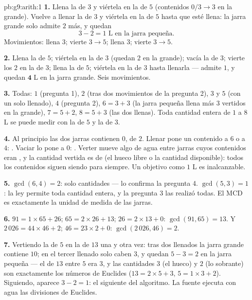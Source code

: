 \begin{solution}{pb:g9:arith:1}
\textbf{1.} Llena la de $3$ y viértela en la de $5$ (contenidos
$0/3 \to 3$ en la grande). Vuelve a llenar la de $3$ y viértela en la
de $5$ hasta que esté llena: la jarra grande solo admite $2$ más, y quedan
\[
3 - 2 = 1 \text{ L en la jarra pequeña.}
\]
Movimientos: llena $3$; vierte $3 \to 5$; llena $3$; vierte $3 \to 5$.

\textbf{2.} Llena la de $5$; viértela en la de $3$ (quedan $2$ en la
grande); vacía la de $3$; vierte los $2$ en la de $3$; llena la de $5$;
viértela en la de $3$ hasta llenarla --- admite $1$, y quedan
$\mathbf{4}$ L en la jarra grande. Seis movimientos.

\textbf{3.} Todas: $1$ (pregunta 1), $2$ (tras dos movimientos
de la pregunta 2), $3$ y $5$ (con un solo llenado), $4$ (pregunta
2), $6 = 3 + 3$ (la jarra pequeña llena más $3$ vertidos en la
grande), $7 = 5 + 2$, $8 = 5 + 3$ (las dos llenas). Toda cantidad entera
de $1$ a $8$ L se puede medir con la de $5$ y la de $3$.

\textbf{4.} Al principio las dos jarras contienen $0$,  de $2$.
Llenar pone un contenido a $6$ o a $4$: . Vaciar lo pone a
$0$: . Verter mueve algo de agua entre jarras cuyos contenidos
eran , y la cantidad vertida es  de  (el hueco libre o la cantidad disponible): todos los contenidos siguen siendo
 para siempre. Un objetivo  como $1$ L es inalcanzable.

\textbf{5.} $\gcd(6, 4) = 2$: solo cantidades  --- lo confirma la
pregunta 4. $\gcd(5, 3) = 1$: la ley permite toda cantidad entera,
y la pregunta 3 las realizó todas. El MCD es exactamente
la unidad de medida de las jarras.

\textbf{6.} $91 = 1 \times 65 + 26$; $65 = 2 \times 26 + 13$;
$26 = 2 \times 13 + 0$: $\gcd(91, 65) = 13$. Y
$2\,026 = 44 \times 46 + 2$; $46 = 23 \times 2 + 0$:
$\gcd(2\,026, 46) = 2$.

\textbf{7.} Vertiendo la de $5$ en la de $13$ una y otra vez: tras dos
llenados la jarra grande contiene $10$; en el tercer llenado solo caben
$3$, y quedan $5 - 3 = 2$ en la jarra pequeña --- el  de
$13$ entre $5$ era $3$, y las cantidades $3$ (el hueco) y $2$
(lo sobrante) son exactamente los números de Euclides ($13 = 2 \times 5 + 3$,
$5 = 1 \times 3 + 2$). Siguiendo, aparece $3 - 2 = 1$: el
 siguiente del algoritmo. La fuente ejecuta con agua las
divisiones de Euclides.


\end{solution}
